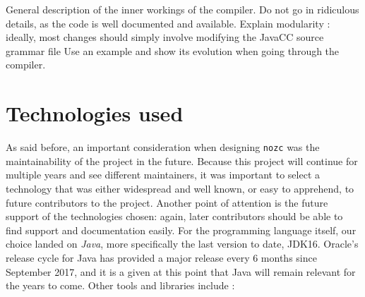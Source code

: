 General description of the inner workings of the compiler.
Do not go in ridiculous details, as the code is well documented and available.
Explain modularity : ideally, most changes should simply involve modifying the JavaCC source grammar file
Use an example and show its evolution when going through the compiler.

\section{Technologies used}\label{sec:ch3-technologies}
As said before, an important consideration when designing \texttt{nozc} was the maintainability of the project in the future.
Because this project will continue for multiple years and see different maintainers, it was important to select a technology that was either widespread and well known, or easy to apprehend, to future contributors to the project.
Another point of attention is the future support of the technologies chosen: again, later contributors should be able to find support and documentation easily.
For the programming language itself, our choice landed on \textit{Java}, more specifically the last version to date, JDK16.
Oracle's release cycle for Java has provided a major release every 6 months since September 2017, and it is a given at this point that Java will remain relevant for the years to come.\newline
Other tools and libraries include :
